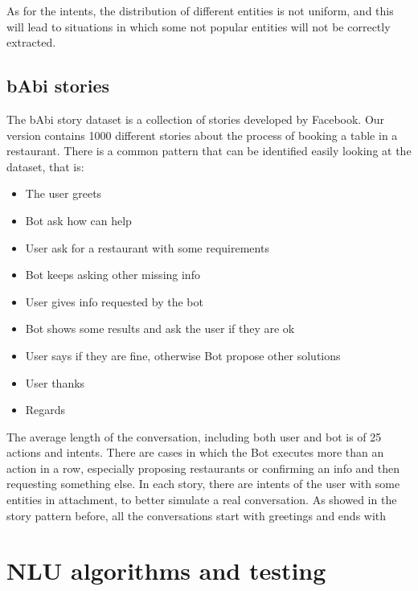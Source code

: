\documentclass[11pt,a4paper]{article}
\begin{document}
As for the intents, the distribution of different entities is not uniform, and this will lead to situations in which some not popular entities will not be correctly extracted. 

\subsection{bAbi stories}

The bAbi story dataset is a collection of stories developed by Facebook. Our version contains 1000 different stories about the process of booking a table in a restaurant. There is a common pattern that can be identified easily looking at the dataset, that is:

\begin{itemize}
\item The user greets
\item Bot ask how can help
\item User ask for a restaurant with some requirements
\item Bot keeps asking other missing info
\item User gives info requested by the bot
\item Bot shows some results and ask the user if they are ok
\item User says if they are fine, otherwise Bot propose other solutions
\item User thanks
\item Regards
\end{itemize}

The average length of the conversation, including both user and bot is of 25 actions and intents. There are cases in which the Bot executes more than an action in a row, especially proposing restaurants or confirming an info and then requesting something else. In each story, there are intents of the user with some entities in attachment, to better simulate a real conversation. As showed in the story pattern before, all the conversations start with greetings and ends with

\section{NLU algorithms and testing}
\end{document}
